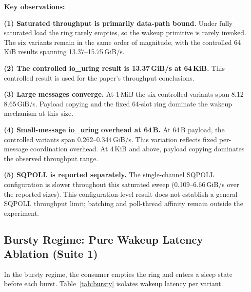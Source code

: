 \documentclass[10pt,conference]{IEEEtran}
\begin{document}
\textbf{Key observations:}

\textbf{(1) Saturated throughput is primarily data-path bound.}
Under fully saturated load the ring rarely empties, so the wakeup primitive is
rarely invoked.  The six variants remain in the same order of magnitude, with
the controlled 64\,KiB results spanning 13.37--15.75\,GiB/s.

\textbf{(2) The controlled io\_uring result is 13.37\,GiB/s at 64\,KiB.}
This controlled result is used for the paper's throughput conclusions.

\textbf{(3) Large messages converge.}
At 1\,MiB the six controlled variants span 8.12--8.65\,GiB/s.  Payload copying
and the fixed 64-slot ring dominate the wakeup mechanism at this size.

\textbf{(4) Small-message io\_uring overhead at 64\,B.}
At 64\,B payload, the controlled variants span 0.262--0.344\,GiB/s.  This
variation reflects fixed per-message coordination overhead. At 4\,KiB and
above, payload copying dominates the observed throughput range.

\textbf{(5) SQPOLL is reported separately.}
The single-channel SQPOLL configuration is slower throughout this saturated
sweep (0.109--6.66\,GiB/s over the reported sizes).  This configuration-level
result does not establish a general SQPOLL throughput limit; batching and
poll-thread affinity remain outside the experiment.

\subsection{Bursty Regime: Pure Wakeup Latency Ablation (Suite 1)}

In the bursty regime, the consumer empties the ring and enters a sleep state
before each burst.  Table~\ref{tab:bursty} isolates wakeup latency per variant.
\end{document}
